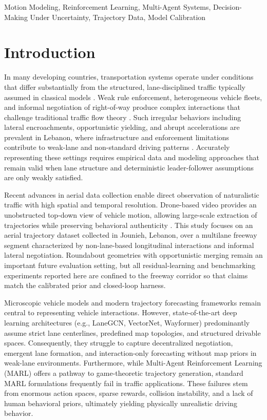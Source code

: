 \documentclass[conference]{IEEEtran}
\begin{document}
\begin{IEEEkeywords}
Motion Modeling, Reinforcement Learning, Multi-Agent Systems, Decision-Making Under Uncertainty, Trajectory Data, Model Calibration
\end{IEEEkeywords}

\section{Introduction}
\label{introduction}

In many developing countries, transportation systems operate under conditions that differ substantially from the structured, lane-disciplined traffic typically assumed in classical models \cite{chandra2004mixedtraffic, arasan2010heterogeneous, sleiman2026diffusion}. Weak rule enforcement, heterogeneous vehicle fleets, and informal negotiation of right-of-way produce complex interactions that challenge traditional traffic flow theory \cite{hoogendoorn2001state}. Such irregular behaviors including lateral encroachments, opportunistic yielding, and abrupt accelerations are prevalent in Lebanon, where infrastructure and enforcement limitations contribute to weak-lane and non-standard driving patterns \cite{xu2018nonlane}. Accurately representing these settings requires empirical data and modeling approaches that remain valid when lane structure and deterministic leader-follower assumptions are only weakly satisfied.

Recent advances in aerial data collection enable direct observation of naturalistic traffic with high spatial and temporal resolution. Drone-based video provides an unobstructed top-down view of vehicle motion, allowing large-scale extraction of trajectories while preserving behavioral authenticity \cite{zhou2017trajectorydrone}. This study focuses on an aerial trajectory dataset collected in Jounieh, Lebanon, over a multilane freeway segment characterized by non-lane-based longitudinal interactions and informal lateral negotiation. Roundabout geometries with opportunistic merging remain an important future evaluation setting, but all residual-learning and benchmarking experiments reported here are confined to the freeway corridor so that claims match the calibrated prior and closed-loop harness.

Microscopic vehicle models and modern trajectory forecasting frameworks remain central to representing vehicle interactions. However, state-of-the-art deep learning architectures (e.g., LaneGCN, VectorNet, Wayformer) predominantly assume strict lane centerlines, predefined map topologies, and structured drivable spaces. Consequently, they struggle to capture decentralized negotiation, emergent lane formation, and interaction-only forecasting without map priors in weak-lane environments. Furthermore, while Multi-Agent Reinforcement Learning (MARL) offers a pathway to game-theoretic trajectory generation, standard MARL formulations frequently fail in traffic applications. These failures stem from enormous action spaces, sparse rewards, collision instability, and a lack of human behavioral priors, ultimately yielding physically unrealistic driving behavior.
\end{document}
